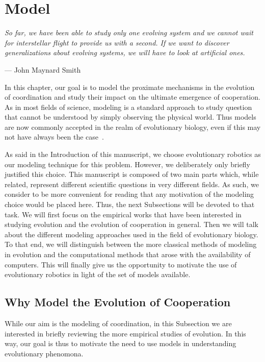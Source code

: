 \chapter{Model}
\label{chapter:model}

\epigraph{\textit{So far, we have been able to study only one evolving system and we cannot wait for interstellar flight to provide us with a second. If we want to discover generalizations about evolving systems, we will have to look at artificial ones.}}{--- \textup{John Maynard Smith}}

\minitoc[n] %

In this chapter, our goal is to model the proximate mechanisms in the evolution of coordination and study their impact on the ultimate emergence of cooperation. As in most fields of science, modeling is a standard approach to study question that cannot be understood by simply observing the physical world. Thus models are now commonly accepted in the realm of evolutionary biology, even if this may not have always been the case~\parencite{Shou2015}. 

As said in the Introduction of this manuscript, we choose evolutionary robotics as our modeling technique for this problem. However, we deliberately only briefly justified this choice. This manuscript is composed of two main parts which, while related, represent different scientific questions in very different fields. As such, we consider to be more convenient for reading that any motivation of the modeling choice would be placed here. Thus, the next Subsections will be devoted to that task. We will first focus on the empirical works that have been interested in studying evolution and the evolution of cooperation in general. Then we will talk about the different modeling approaches used in the field of evolutionary biology. To that end, we will distinguish between the more classical methods of modeling in evolution and the computational methods that arose with the availability of computers. This will finally give us the opportunity to motivate the use of evolutionary robotics in light of the set of models available.


\section{Why Model the Evolution of Cooperation}

    While our aim is the modeling of coordination, in this Subsection we are interested in briefly reviewing the more empirical studies of evolution. In this way, our goal is thus to motivate the need to use models in understanding evolutionary phenomona.

